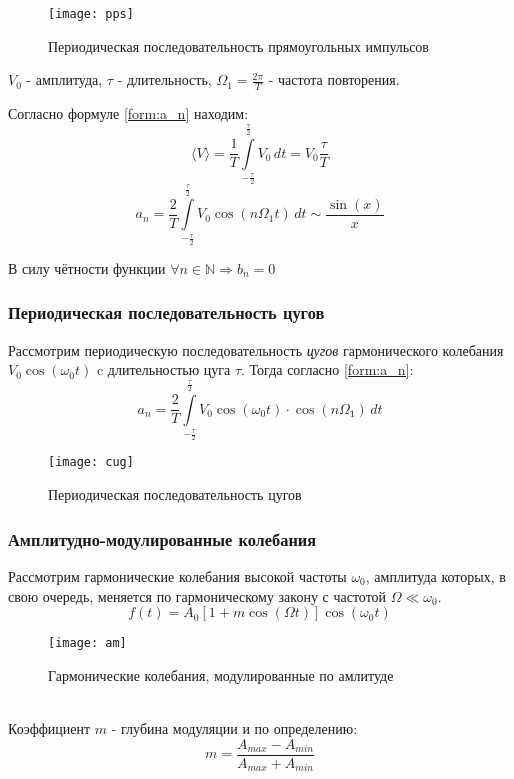 \documentclass[a4paper,12pt]{article}
\begin{document}
\begin{figure}[!ht]
\texttt{[image: pps]}
\caption{Периодическая последовательность прямоугольных импульсов}
\end{figure}

$V_0$  - амплитуда, $\tau$ - длительность, $\Omega_1 = \frac{2\pi}{T} $ - частота повторения.

Согласно формуле \ref{form:a_n} находим:
$$ \langle V \rangle = \frac{1}{T}\int\limits_{ -\frac{\tau}{2} } ^ {\frac{\tau}{2} } V_0\,dt = V_0 \frac{\tau}{T}
$$
\begin{equation}
\label{form:app_a_n}
	a_n = \frac{2}{T}\int\limits_{ -\frac{\tau}{2} } ^ {\frac{\tau}{2} } V_0\cos(n\Omega_1t)\, dt \sim \frac{\sin(x)}{x}
\end{equation}
 
В силу чётности функции $\forall n \in \mathbb {N} \Rightarrow b_n=0$
\subsubsection*{Периодическая последовательность цугов}
Рассмотрим периодическую последовательность {\it{цугов}} гармонического колебания $V_0\cos(\omega_0t)$ c длительностью цуга $\tau$. 
Тогда согласно \ref{form:a_n}:
\begin{equation}
\label{form:cug_a_n}
a_n = \frac{2}{T}\int\limits_{ -\frac{\tau}{2} } ^ {\frac{\tau}{2} } V_0\cos(\omega_0t)\cdot \cos(n\Omega_1)\, dt
\end{equation}
\newpage
\begin{figure}[ht]
\texttt{[image: cug]}
\caption{Периодическая последовательность цугов}
\end{figure}
\subsubsection*{Амплитудно-модулированные колебания}

Рассмотрим гармонические колебания высокой частоты $\omega_0$, амплитуда которых, в свою очередь, меняется по гармоническому закону с частотой $\Omega\ll\omega_0$.
\begin{equation}
\label{form:amf(t)_a_n}
	f(t) = A_0[1+m\cos(\Omega t)]\cos(\omega_0t)
\end{equation}
\begin{figure}[ht]
\texttt{[image: am]}
\caption{Гармонические колебания, модулированные по амлитуде}
\end{figure}
\ \\
Коэффициент $m$ - глубина модуляции и по определению:
\begin{equation}
\label{form:m}
	m = \frac{A_{max}-A_{min}}{A_{max}+A_{min}}
\end{equation}
\end{document}
